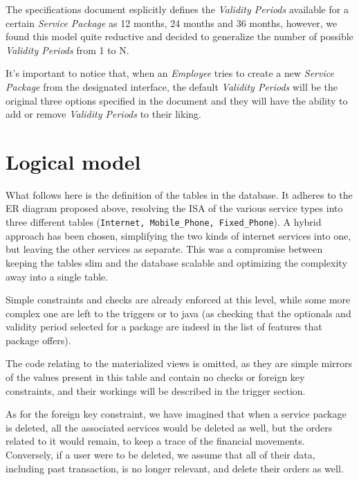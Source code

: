 The specifications document esplicitly defines the \textit{Validity Periods} available for a certain \textit{Service Package} as 12 months, 24 months and 36 months, however, we found this model quite reductive and decided to generalize the number of possible \textit{Validity Periods} from 1 to N.

It's important to notice that, when an \textit{Employee} tries to create a new \textit{Service Package} from the designated interface, the default \textit{Validity Periods} will be the original three options specified in the document and they will have the ability to add or remove \textit{Validity Periods} to their liking.


\section{Logical model}
\label{sec:logical_model}

What follows here is the definition of the tables in the database. It adheres to the ER diagram proposed above, resolving the ISA of the various service types into three different tables (\texttt{Internet, Mobile\_Phone, Fixed\_Phone}). A hybrid approach has been chosen, simplifying the two kinds of internet services into one, but leaving the other services as separate. This was a compromise between keeping the tables slim and the database scalable and optimizing the complexity away into a single table.

Simple constraints and checks are already enforced at this level, while some more complex one are left to the triggers or to java (as checking that the optionals and validity period selected for a package are indeed in the list of features that package offers).

The code relating to the materialized views is omitted, as they are simple mirrors of the values present in this table and contain no checks or foreign key constraints, and their workings will be described in the trigger section.

As for the foreign key constraint, we have imagined that when a service package is deleted, all the associated services would be deleted as well, but the orders related to it would remain, to keep a trace of the financial movements. Conversely, if a user were to be deleted, we assume that all of their data, including past transaction, is no longer relevant, and delete their orders as well.

